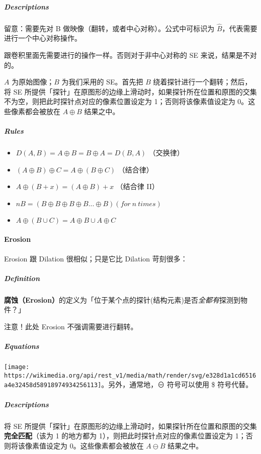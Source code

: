 \documentclass[
]{article}
\begin{document}
\hypertarget{header-n18}{%
\subparagraph{Descriptions}\label{header-n18}}

留意：需要先对 B 做映像（翻转，或者中心对称）。公式中可标识为
\(\hat{B}\)，代表需要进行一个中心对称操作。

跟卷积里面先需要进行的操作一样。否则对于非中心对称的 SE
来说，结果是不对的。

\(A\) 为原始图像；\(B\) 为我们采用的 SE。首先把 \(B\)
绕着探针进行一个翻转；然后，将 SE
所提供「探针」在原图形的边缘上滑动时，如果探针所在位置和原图的交集不为空，则把此时探针点对应的像素位置设定为
1；否则将该像素值设定为 0。这些像素都会被放在 \(A ⊕ B\) 结果之中。

\hypertarget{header-n22}{%
\subparagraph{Rules}\label{header-n22}}

\begin{itemize}
\item
  \(D(A, B) = A ⊕ B = B ⊕ A = D(B, A)\) （交换律）
\item
  \((A ⊕ B) ⊕ C = A ⊕ (B ⊕ C)\) （结合律）
\item
  \(A ⊕ (B + x) = (A ⊕ B) + x\) （结合律 II）
\item
  \(nB = (B ⊕ B ⊕ B ⊕ B ... ⊕ B) (for\ n\ times)\)
\item
  \(A ⊕ (B ∪ C) = A ⊕ B ∪ A ⊕ C\)
\end{itemize}

\hypertarget{header-n34}{%
\paragraph{Erosion}\label{header-n34}}

Erosion 跟 Dilation 很相似；只是它比 Dilation 苛刻很多：

\hypertarget{header-n36}{%
\subparagraph{Definition}\label{header-n36}}

\textbf{腐蚀（Erosion）}的定义为「位于某个点的探针(结构元素)是否\emph{全都有}探测到物件？」

注意！此处 Erosion 不强调需要进行翻转。

\hypertarget{header-n39}{%
\subparagraph{Equations}\label{header-n39}}

\texttt{[image: https://wikimedia.org/api/rest\_v1/media/math/render/svg/e328d1a1cd6516a4e32458d58918974934256113]}。另外，通常地，⊖
符号可以使用 \$ 符号代替。

\hypertarget{header-n41}{%
\subparagraph{Descriptions}\label{header-n41}}

将 SE
所提供「探针」在原图形的边缘上滑动时，如果探针所在位置和原图的交集\textbf{完全匹配}（该为
1 的地方都为 1），则把此时探针点对应的像素位置设定为
1；否则将该像素值设定为 0。这些像素都会被放在 \(A ⊖ B\) 结果之中。
\end{document}
